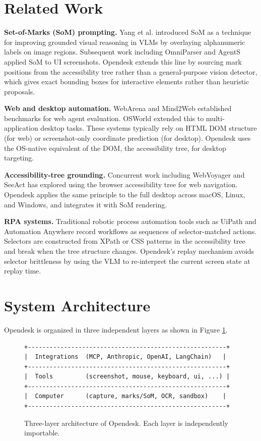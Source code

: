\documentclass[11pt]{article}
\begin{document}
\section{Related Work}

\textbf{Set-of-Marks (SoM) prompting.} Yang et al. \cite{yang2023som} introduced SoM as a technique for improving grounded visual reasoning in VLMs by overlaying alphanumeric labels on image regions. Subsequent work including OmniParser \cite{omniparser} and AgentS \cite{agentS} applied SoM to UI screenshots. Opendesk extends this line by sourcing mark positions from the accessibility tree rather than a general-purpose vision detector, which gives exact bounding boxes for interactive elements rather than heuristic proposals.

\textbf{Web and desktop automation.} WebArena \cite{webarena} and Mind2Web \cite{mind2web} established benchmarks for web agent evaluation. OSWorld \cite{osworld} extended this to multi-application desktop tasks. These systems typically rely on HTML DOM structure (for web) or screenshot-only coordinate prediction (for desktop). Opendesk uses the OS-native equivalent of the DOM, the accessibility tree, for desktop targeting.

\textbf{Accessibility-tree grounding.} Concurrent work including WebVoyager \cite{webvoyager} and SeeAct \cite{seeact} has explored using the browser accessibility tree for web navigation. Opendesk applies the same principle to the full desktop across macOS, Linux, and Windows, and integrates it with SoM rendering.

\textbf{RPA systems.} Traditional robotic process automation tools such as UiPath and Automation Anywhere record workflows as sequences of selector-matched actions. Selectors are constructed from XPath or CSS patterns in the accessibility tree and break when the tree structure changes. Opendesk's replay mechanism avoids selector brittleness by using the VLM to re-interpret the current screen state at replay time.

\section{System Architecture}

Opendesk is organized in three independent layers as shown in Figure \ref{fig:arch}.

\begin{figure}[h]
\centering
\begin{verbatim}
+-------------------------------------------------------+
|  Integrations  (MCP, Anthropic, OpenAI, LangChain)   |
+-------------------------------------------------------+
|  Tools         (screenshot, mouse, keyboard, ui, ...) |
+-------------------------------------------------------+
|  Computer      (capture, marks/SoM, OCR, sandbox)    |
+-------------------------------------------------------+
\end{verbatim}
\caption{Three-layer architecture of Opendesk. Each layer is independently importable.}
\label{fig:arch}
\end{figure}
\end{document}
